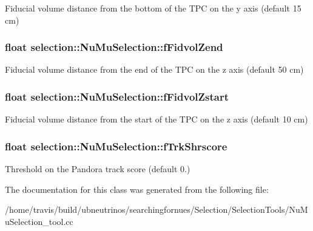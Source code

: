Fiducial volume distance from the bottom of the T\-P\-C on the y axis (default 15 cm) \hypertarget{classselection_1_1NuMuSelection_adae665ca6cf1ece4b7e00b345cebbfe3}{
\subsubsection[{f\-Fidvol\-Zend}]{\setlength{\rightskip}{0pt plus 5cm}float selection\-::\-Nu\-Mu\-Selection\-::f\-Fidvol\-Zend\hspace{0.3cm}{\ttfamily [private]}}}\label{classselection_1_1NuMuSelection_adae665ca6cf1ece4b7e00b345cebbfe3}
Fiducial volume distance from the end of the T\-P\-C on the z axis (default 50 cm) \hypertarget{classselection_1_1NuMuSelection_afd0602fc9b69392ffb8dbc36c6ff3e61}{
\subsubsection[{f\-Fidvol\-Zstart}]{\setlength{\rightskip}{0pt plus 5cm}float selection\-::\-Nu\-Mu\-Selection\-::f\-Fidvol\-Zstart\hspace{0.3cm}{\ttfamily [private]}}}\label{classselection_1_1NuMuSelection_afd0602fc9b69392ffb8dbc36c6ff3e61}
Fiducial volume distance from the start of the T\-P\-C on the z axis (default 10 cm) \hypertarget{classselection_1_1NuMuSelection_ad112dbbc5a443a1ff5408c512788a154}{
\subsubsection[{f\-Trk\-Shrscore}]{\setlength{\rightskip}{0pt plus 5cm}float selection\-::\-Nu\-Mu\-Selection\-::f\-Trk\-Shrscore\hspace{0.3cm}{\ttfamily [private]}}}\label{classselection_1_1NuMuSelection_ad112dbbc5a443a1ff5408c512788a154}
Threshold on the Pandora track score (default 0.) 

The documentation for this class was generated from the following file\-:\begin{DoxyCompactItemize}
\item 
/home/travis/build/ubneutrinos/searchingfornues/\-Selection/\-Selection\-Tools/Nu\-Mu\-Selection\-\_\-tool.\-cc\end{DoxyCompactItemize}

